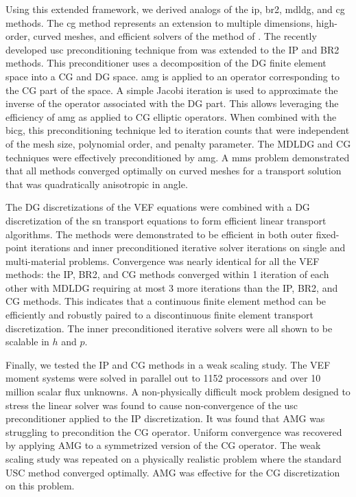 \documentclass[../doc.tex]{subfiles}
\begin{document}
Using this extended framework, we derived analogs of the \gls{ip}, \gls{br2}, \gls{mdldg}, and \gls{cg} methods. The \gls{cg} method represents an extension to multiple dimensions, high-order, curved meshes, and efficient solvers of the method of \textcite{two-level-independent-warsa}. 
The recently developed \gls{usc} preconditioning technique from \textcite{Pazner2021} was extended to the IP and BR2 methods. This preconditioner uses a decomposition of the DG finite element space into a CG and DG space. \gls{amg} is applied to an operator corresponding to the CG part of the space. A simple Jacobi iteration is used to approximate the inverse of the operator associated with the DG part. This allows leveraging the efficiency of \gls{amg} as applied to CG elliptic operators. When combined with the \gls{bicg}, this preconditioning technique led to iteration counts that were independent of the mesh size, polynomial order, and penalty parameter. The MDLDG and CG techniques were effectively preconditioned by \gls{amg}. A \gls{mms} problem demonstrated that all methods converged optimally on curved meshes for a transport solution that was quadratically anisotropic in angle. 

The DG discretizations of the VEF equations were combined with a DG discretization of the \gls{sn} transport equations to form efficient linear transport algorithms. The methods were demonstrated to be efficient in both outer fixed-point iterations and inner preconditioned iterative solver iterations on single and multi-material problems. Convergence was nearly identical for all the VEF methods: the IP, BR2, and CG methods converged within 1 iteration of each other with MDLDG requiring at most 3 more iterations than the IP, BR2, and CG methods. This indicates that a continuous finite element method can be efficiently and robustly paired to a discontinuous finite element transport discretization. The inner preconditioned iterative solvers were all shown to be scalable in $h$ and $p$. 

Finally, we tested the IP and CG methods in a weak scaling study. The VEF moment systems were solved in parallel out to 1152 processors and over 10 million scalar flux unknowns. 
A non-physically difficult mock problem designed to stress the linear solver was found to cause non-convergence of the \gls{usc} preconditioner applied to the IP discretization. It was found that AMG was struggling to precondition the CG operator. Uniform convergence was recovered by applying AMG to a symmetrized version of the CG operator. The weak scaling study was repeated on a physically realistic problem where the standard USC method converged optimally. AMG was effective for the CG discretization on this problem. 
\end{document}
